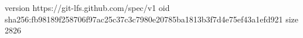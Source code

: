 version https://git-lfs.github.com/spec/v1
oid sha256:fb98189f258706f97ac25c37c3c7980e20785ba1813b3f7d4e75ef43a1efd921
size 2826
